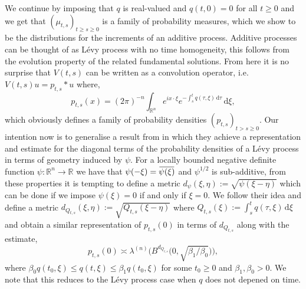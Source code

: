 \documentclass[a4paper, 12pt]{report}
\theoremstyle{remark}
\theoremstyle{definition}
\newcommand{\overbar}[1]{\mkern 1.5mu\overline{\mkern-1.5mu#1\mkern-1.5mu}\mkern 1.5mu}
\begin{document}
We continue by imposing that $q$ is real-valued and $q(t, 0) = 0$ for all $t \ge 0$ and we get that $(\mu_{t, s})_{t \ge s \ge 0}$ is a family of probability measures, which we show to be the distributions for the increments of an additive process.  Additive processes can be thought of as L\'evy process with no time homogeneity, this follows from the evolution property of the related fundamental solutions.  From here it is no surprise that $V(t, s)$ can be written as a convolution operator, i.e. $V(t, s)u = p_{t, s} \ast u$ where,
$$
p_{t, s}(x) = (2\pi)^{-n}\int_{\mathbb{R}^n}e^{ix\cdot\xi}e^{-\int_s^tq(\tau, \xi)\,\mathrm{d}\tau}\,\mathrm{d}\xi,
$$
which obviously defines a family of probability densities $(p_{t, s})_{t > s \ge 0}$.  Our intention now is to generalise a result from \cite{Paper} in which they achieve a representation and estimate for the diagonal terms of the probability densities of a L\'evy process in terms of geometry induced by $\psi$.  For a locally bounded negative definite function $\psi : \mathbb{R}^n \to \mathbb{R}$ we have that $\psi(-\xi) = \overbar{\psi(\xi)}$ and $\psi^{1/2}$ is sub-additive, from these properties it is tempting to define a metric $d_\psi(\xi, \eta) := \sqrt{\psi(\xi - \eta)}$ which can be done if we impose $\psi(\xi) = 0$ if and only if $\xi = 0$.  We follow their idea and define a metric $d_{Q_{t, s}}(\xi, \eta) := \sqrt{Q_{t, s}(\xi - \eta)}$ where $Q_{t, s}(\xi) := \int_s^tq(\tau, \xi)\,\mathrm{d}\xi$ and obtain a similar representation of $p_{t, s}(0)$ in terms of $d_{Q_{t, s}}$ along with the estimate,
$$
p_{t, s}(0) \asymp \lambda^{(n)}\Big(B^{d_{Q_{t, s}}}\big(0, \sqrt{\beta_1/\beta_0}\big)\Big),
$$
where $\beta_0q(t_0, \xi) \le q(t, \xi) \le \beta_1q(t_0, \xi)$ for some $t_0 \ge 0$ and $\beta_1, \beta_0 > 0$.  We note that this reduces to the L\'evy process case when $q$ does not depened on time.
\end{document}
